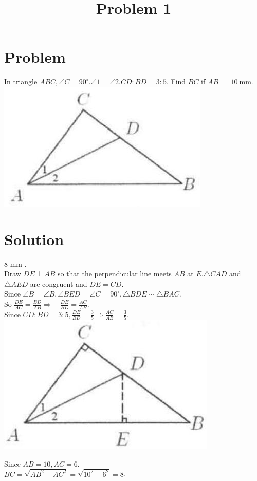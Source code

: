 \documentclass{article}
\title{Problem 1}
\date{}
\begin{document}
\maketitle

\section*{Problem}
In triangle \(A B C, \angle C=90^{\circ} . \angle 1=\angle 2 . C D: B D=3: 5\). Find \(B C\) if \(A B\) \(=10 \mathrm{~mm}\).\\
\centering
\includegraphics[width=\textwidth]{images/problem_image_1.jpg}

\section*{Solution}
8 mm .\\
Draw \(D E \perp A B\) so that the perpendicular line meets \(A B\) at \(E . \triangle C A D\) and \(\triangle A E D\) are congruent and \(D E=C D\).\\
Since \(\angle B=\angle B, \angle B E D=\angle C=90^{\circ}, \triangle B D E \sim \triangle B A C\).\\
So \(\frac{D E}{A C}=\frac{B D}{A B} \Rightarrow \quad \frac{D E}{B D}=\frac{A C}{A B}\).\\
Since \(C D: B D=3: 5, \frac{D E}{B D}=\frac{3}{5} \Rightarrow \frac{A C}{A B}=\frac{3}{5}\).\\
\centering
\includegraphics[width=\textwidth]{images/reasoning_image_1.jpg}

Since \(A B=10, A C=6\).\\
\(B C=\sqrt{A B^{2}-A C^{2}}=\sqrt{10^{2}-6^{2}}=8\).
\end{document}
